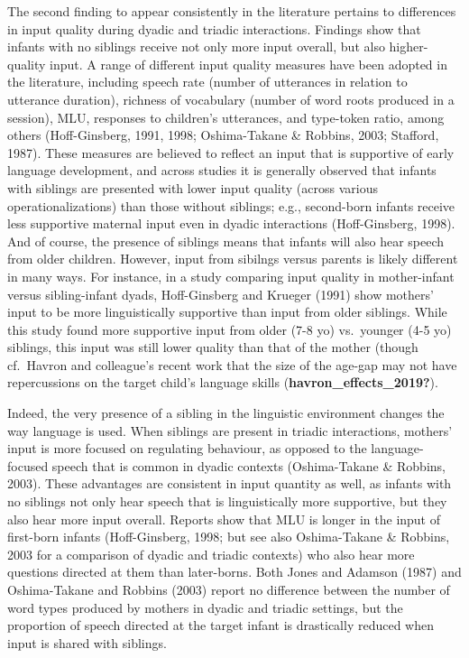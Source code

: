 \documentclass[
  english,
  man,floatsintext]{apa6}
\begin{document}
The second finding to appear consistently in the literature pertains to differences in input quality during dyadic and triadic interactions. Findings show that infants with no siblings receive not only more input overall, but also higher-quality input. A range of different input quality measures have been adopted in the literature, including speech rate (number of utterances in relation to utterance duration), richness of vocabulary (number of word roots produced in a session), MLU, responses to children's utterances, and type-token ratio, among others (Hoff-Ginsberg, 1991, 1998; Oshima-Takane \& Robbins, 2003; Stafford, 1987). These measures are believed to reflect an input that is supportive of early language development, and across studies it is generally observed that infants with siblings are presented with lower input quality (across various operationalizations) than those without siblings; e.g., second-born infants receive less supportive maternal input even in dyadic interactions (Hoff-Ginsberg, 1998). And of course, the presence of siblings means that infants will also hear speech from older children. However, input from sibilngs versus parents is likely different in many ways. For instance, in a study comparing input quality in mother-infant versus sibling-infant dyads, Hoff-Ginsberg and Krueger (1991) show mothers' input to be more linguistically supportive than input from older siblings. While this study found more supportive input from older (7-8 yo) vs.~younger (4-5 yo) siblings, this input was still lower quality than that of the mother (though cf.~Havron and colleague's recent work that the size of the age-gap may not have repercussions on the target child's language skills (\textbf{havron\_effects\_2019?}).

Indeed, the very presence of a sibling in the linguistic environment changes the way language is used. When siblings are present in triadic interactions, mothers' input is more focused on regulating behaviour, as opposed to the language-focused speech that is common in dyadic contexts (Oshima-Takane \& Robbins, 2003). These advantages are consistent in input quantity as well, as infants with no siblings not only hear speech that is linguistically more supportive, but they also hear more input overall. Reports show that MLU is longer in the input of first-born infants (Hoff-Ginsberg, 1998; but see also Oshima-Takane \& Robbins, 2003 for a comparison of dyadic and triadic contexts) who also hear more questions directed at them than later-borns. Both Jones and Adamson (1987) and Oshima-Takane and Robbins (2003) report no difference between the number of word types produced by mothers in dyadic and triadic settings, but the proportion of speech directed at the target infant is drastically reduced when input is shared with siblings.
\end{document}
